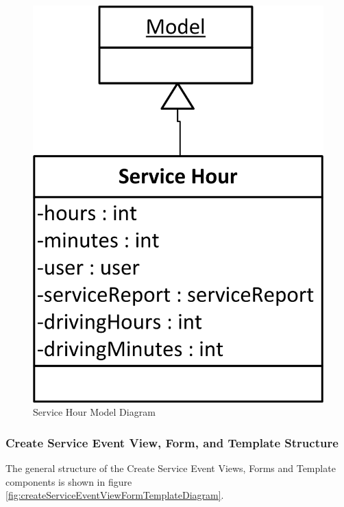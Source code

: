 \documentclass{article}
\begin{document}
\FloatBarrier
\begin{figure}[h!]
\centering
\includegraphics[scale=.65]{img/modelDiagrams/serviceHourModel}
\caption{Service Hour Model Diagram}
\label{fig:serviceHourModelDiagram}
\end{figure}
\FloatBarrier

\subsubsection{Create Service Event View, Form, and Template Structure}

The general structure of the Create Service Event Views, Forms and Template components is shown in figure \ref{fig:createServiceEventViewFormTemplateDiagram}.
\end{document}
